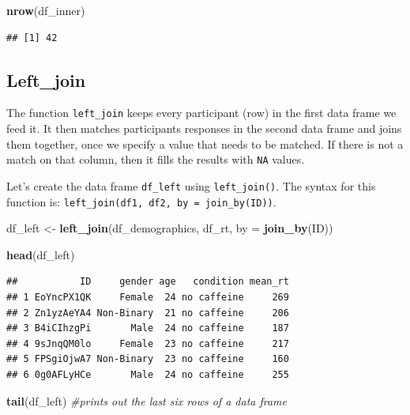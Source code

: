 \documentclass[
]{book}
\newenvironment{Shaded}{\begin{snugshade}}{\end{snugshade}}
\newcommand{\AttributeTok}[1]{\textcolor[rgb]{0.13,0.29,0.53}{#1}}
\newcommand{\CommentTok}[1]{\textcolor[rgb]{0.56,0.35,0.01}{\textit{#1}}}
\newcommand{\FunctionTok}[1]{\textcolor[rgb]{0.13,0.29,0.53}{\textbf{#1}}}
\newcommand{\NormalTok}[1]{#1}
\newcommand{\OtherTok}[1]{\textcolor[rgb]{0.56,0.35,0.01}{#1}}
\begin{document}
\begin{Shaded}
\begin{Highlighting}[]
\FunctionTok{nrow}\NormalTok{(df\_inner)}
\end{Highlighting}
\end{Shaded}

\begin{verbatim}
## [1] 42
\end{verbatim}

\hypertarget{left_join}{%
\subsection{Left\_join}\label{left_join}}

The function \texttt{left\_join} keeps every participant (row) in the first data frame we feed it. It then matches participants responses in the second data frame and joins them together, once we specify a value that needs to be matched. If there is not a match on that column, then it fills the results with \texttt{NA} values.

Let's create the data frame \texttt{df\_left} using \texttt{left\_join()}. The syntax for this function is: \texttt{left\_join(df1,\ df2,\ by\ =\ join\_by(ID))}.

\begin{Shaded}
\begin{Highlighting}[]
\NormalTok{df\_left }\OtherTok{\textless{}{-}} \FunctionTok{left\_join}\NormalTok{(df\_demographics, df\_rt, }\AttributeTok{by =} \FunctionTok{join\_by}\NormalTok{(ID))}


\FunctionTok{head}\NormalTok{(df\_left)}
\end{Highlighting}
\end{Shaded}

\begin{verbatim}
##           ID     gender age   condition mean_rt
## 1 EoYncPX1QK     Female  24 no caffeine     269
## 2 Zn1yzAeYA4 Non-Binary  21 no caffeine     206
## 3 B4iCIhzgPi       Male  24 no caffeine     187
## 4 9sJnqQM0lo     Female  23 no caffeine     217
## 5 FPSgiOjwA7 Non-Binary  23 no caffeine     160
## 6 0g0AFLyHCe       Male  24 no caffeine     255
\end{verbatim}

\begin{Shaded}
\begin{Highlighting}[]
\FunctionTok{tail}\NormalTok{(df\_left) }\CommentTok{\#prints out the last six rows of a data frame}
\end{Highlighting}
\end{Shaded}
\end{document}
